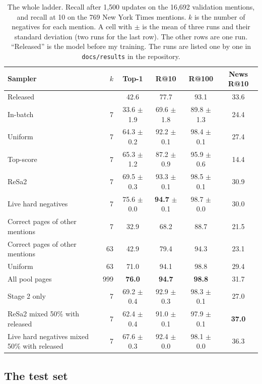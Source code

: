 \documentclass[11pt]{article}
\theoremstyle{definition}
\begin{document}
\begin{table}[t]
\centering
\footnotesize
\setlength{\tabcolsep}{4pt}
\caption{The whole ladder. Recall after 1,500 updates on the 16,692 validation mentions, and recall at 10 on the 769 New York Times mentions. $k$ is the number of negatives for each mention. A cell with $\pm$ is the mean of three runs and their standard deviation (two runs for the last row). The other rows are one run. ``Released'' is the model before my training. The runs are listed one by one in \texttt{docs/results} in the repository.}
\label{tab:main}
\begin{tabular}{@{}lrcccc@{}}
\toprule
Sampler & $k$ & Top-1 & R@10 & R@100 & News R@10 \\
\midrule
Released & & 42.6 & 77.7 & 93.1 & 33.6 \\
In-batch & 7 & 33.6 $\pm$ 1.9 & 69.6 $\pm$ 1.8 & 89.8 $\pm$ 1.3 & 24.4 \\
Uniform & 7 & 64.3 $\pm$ 0.2 & 92.2 $\pm$ 0.1 & 98.4 $\pm$ 0.1 & 27.4 \\
Top-score & 7 & 65.3 $\pm$ 1.2 & 87.2 $\pm$ 0.9 & 95.9 $\pm$ 0.6 & 14.4 \\
ReSa2 & 7 & 69.5 $\pm$ 0.3 & 93.3 $\pm$ 0.1 & 98.5 $\pm$ 0.1 & 30.9 \\
Live hard negatives & 7 & 75.6 $\pm$ 0.0 & \textbf{94.7} $\pm$ 0.1 & 98.7 $\pm$ 0.0 & 30.0 \\
\midrule
Correct pages of other mentions & 7 & 32.9 & 68.2 & 88.7 & 21.5 \\
Correct pages of other mentions & 63 & 42.9 & 79.4 & 94.3 & 23.1 \\
Uniform & 63 & 71.0 & 94.1 & 98.8 & 29.4 \\
All pool pages & 999 & \textbf{76.0} & \textbf{94.7} & \textbf{98.8} & 31.7 \\
Stage 2 only & 7 & 69.2 $\pm$ 0.4 & 92.9 $\pm$ 0.3 & 98.3 $\pm$ 0.1 & 27.0 \\
\midrule
ReSa2 mixed 50\% with released & 7 & 62.4 $\pm$ 0.4 & 91.0 $\pm$ 0.1 & 97.9 $\pm$ 0.1 & \textbf{37.0} \\
Live hard negatives mixed 50\% with released & 7 & 67.6 $\pm$ 0.3 & 92.4 $\pm$ 0.0 & 98.1 $\pm$ 0.0 & 36.3 \\
\bottomrule
\end{tabular}
\end{table}

\subsection{The test set}
\label{sec:test}
\end{document}
